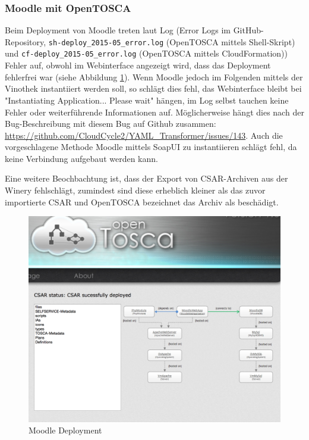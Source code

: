 \subsubsection{Moodle mit OpenTOSCA}
Beim Deployment von Moodle treten laut Log (Error Logs im GitHub-Repository, \verb|sh-deploy_2015-05_error.log| (OpenTOSCA mittels Shell-Skript) und \verb|cf-deploy_2015-05_error.log| (OpenTOSCA mittels CloudFormation)) Fehler auf, obwohl im Webinterface angezeigt wird, dass das Deployment fehlerfrei war (siehe Abbildung \ref{fig:moodle_deployment}). Wenn Moodle jedoch im Folgenden mittels der Vinothek instantiiert werden soll, so schlägt dies fehl, das Webinterface bleibt bei "Instantiating Application... Please wait" hängen, im Log selbst tauchen keine Fehler oder weiterführende Informationen auf. Möglicherweise hängt dies nach der Bug-Beschreibung mit diesem Bug auf Github zusammen: \url{https://github.com/CloudCycle2/YAML_Transformer/issues/143}. Auch die vorgeschlagene Methode Moodle mittels SoapUI zu instantiieren schlägt fehl, da keine Verbindung aufgebaut werden kann. 

Eine weitere Beochbachtung ist, dass der Export von CSAR-Archiven aus der Winery fehlschlägt, zumindest sind diese erheblich kleiner als das zuvor importierte CSAR und OpenTOSCA bezeichnet das Archiv als beschädigt.
\begin{figure}
\centering
\includegraphics[width=\textwidth]{moodle_success.png}
\caption{Moodle Deployment}
\label{fig:moodle_deployment}
\end{figure}